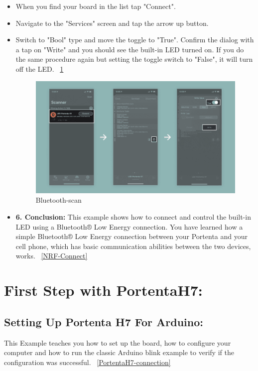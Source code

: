 \begin{itemize}
				\item When you find your board in the list tap "Connect".
				\item Navigate to the "Services" screen and tap the arrow up button.
				\item Switch to "Bool" type and move the toggle to "True". Confirm the dialog with a tap on "Write" and you should see the built-in LED turned on. If you do the same procedure again but setting the toggle switch to "False", it will turn off the LED. ~\ref{Bluetooth-scan}
					\begin{figure}
						\begin{center}
							\includegraphics[width=0.7\linewidth]{Images/PortentaH7/Bluetooth-scan.png}
							\caption{Bluetooth-scan}
							\label{Bluetooth-scan}
						\end{center}
					\end{figure}
				\item \textbf{6. Conclusion:} This example shows how to connect and control the built-in LED using a Bluetooth® Low Energy connection. You have learned how a simple Bluetooth® Low Energy connection between your Portenta and your cell phone, which has basic communication abilities between the two devices, works. ~\ref{NRF-Connect}	
				
			\end{itemize}
		

		



\section{First Step with PortentaH7:}
	
	\subsection{Setting Up Portenta H7 For Arduino:}
		This Example teaches you how to set up the board, how to configure your computer and how to run the classic Arduino blink example to verify if the configuration was successful. ~\ref{PortentaH7-connection} \cite{portentaSetup:2024}
